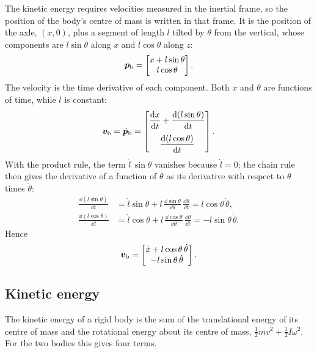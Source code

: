 The kinetic energy requires velocities measured in the inertial frame, so the
position of the body's centre of mass is written in that frame. It is the
position of the axle, $(x,0)$, plus a segment of length $l$ tilted by $\theta$
from the vertical, whose components are $l\sin\theta$ along $x$ and
$l\cos\theta$ along $z$:
\begin{equation}
  \bm{p}_{\mathrm b} = \begin{bmatrix} x + l\sin\theta \\ l\cos\theta \end{bmatrix}.
  \label{eq:pb}
\end{equation}
The velocity is the time derivative of each component. Both $x$ and $\theta$
are functions of time, while $l$ is constant:
\begin{equation}
  \bm{v}_{\mathrm b} = \dot{\bm p}_{\mathrm b}
  = \begin{bmatrix}
      \dfrac{\mathrm{d} x}{\mathrm{d} t} + \dfrac{\mathrm{d} (l\sin\theta)}{\mathrm{d} t} \\[10pt]
      \dfrac{\mathrm{d} (l\cos\theta)}{\mathrm{d} t}
    \end{bmatrix}.
\end{equation}
With the product rule, the term $\dot l\,\sin\theta$ vanishes because
$\dot l=0$; the chain rule then gives the derivative of a function of $\theta$
as its derivative with respect to $\theta$ times $\dot\theta$:
\begin{align}
  \frac{\dd (l\sin\theta)}{\dd t} &= \dot l\sin\theta + l\,\frac{\dd\sin\theta}{\dd\theta}\,\frac{\dd\theta}{\dd t} = l\cos\theta\,\dot\theta , \\
  \frac{\dd (l\cos\theta)}{\dd t} &= \dot l\cos\theta + l\,\frac{\dd\cos\theta}{\dd\theta}\,\frac{\dd\theta}{\dd t} = -l\sin\theta\,\dot\theta .
\end{align}
Hence
\begin{equation}
  \bm{v}_{\mathrm b} = \begin{bmatrix} \dot x + l\cos\theta\,\dot\theta \\ -l\sin\theta\,\dot\theta \end{bmatrix}.
  \label{eq:vb}
\end{equation}

\subsection{Kinetic energy}

The kinetic energy of a rigid body is the sum of the translational energy of
its centre of mass and the rotational energy about its centre of mass,
$\frac12 m v^2 + \frac12 I\omega^2$. For the two bodies this gives four terms.

